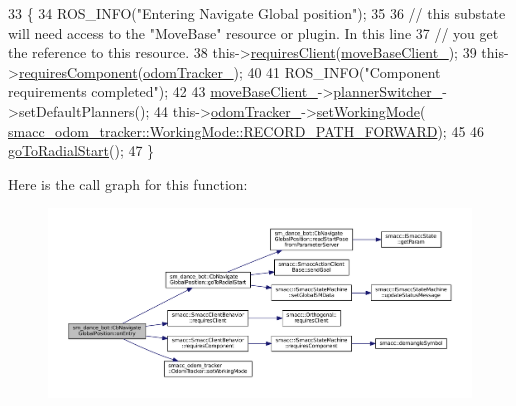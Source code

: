 \begin{DoxyCode}
33   \{
34     ROS\_INFO(\textcolor{stringliteral}{"Entering Navigate Global position"});
35 
36     \textcolor{comment}{// this substate will need access to the "MoveBase" resource or plugin. In this line}
37     \textcolor{comment}{// you get the reference to this resource.}
38     this->\hyperlink{classsmacc_1_1SmaccClientBehavior_adc21bbd45d36bd81ca6f778ed161807a}{requiresClient}(\hyperlink{classsm__dance__bot_1_1CbNavigateGlobalPosition_acaea61e5bdf69018d945f6c7025acfc0}{moveBaseClient\_});
39     this->\hyperlink{classsmacc_1_1SmaccClientBehavior_a011246bb1424f8bf8c9322f652db9d88}{requiresComponent}(\hyperlink{classsm__dance__bot_1_1CbNavigateGlobalPosition_a1d9fbebe8579cdef9485698e99ca8a41}{odomTracker\_});
40 
41     ROS\_INFO(\textcolor{stringliteral}{"Component requirements completed"});
42 
43     \hyperlink{classsm__dance__bot_1_1CbNavigateGlobalPosition_acaea61e5bdf69018d945f6c7025acfc0}{moveBaseClient\_}->\hyperlink{classsmacc_1_1SmaccMoveBaseActionClient_ae24164268108abf0b35cf51bfba5ec67}{plannerSwitcher\_}->setDefaultPlanners();
44     this->\hyperlink{classsm__dance__bot_1_1CbNavigateGlobalPosition_a1d9fbebe8579cdef9485698e99ca8a41}{odomTracker\_}->\hyperlink{classsmacc__odom__tracker_1_1OdomTracker_a38fbca999297c46dc95628cc60851a45}{setWorkingMode}(
      \hyperlink{namespacesmacc__odom__tracker_ade9730dd5cc10ccfad9362176cf46c33a989d06a586bcf9520889228da7faa643}{smacc\_odom\_tracker::WorkingMode::RECORD\_PATH\_FORWARD});
45 
46     \hyperlink{classsm__dance__bot_1_1CbNavigateGlobalPosition_a0832f7a7f205cc483be012aef9501312}{goToRadialStart}();
47   \}
\end{DoxyCode}


Here is the call graph for this function\+:
\nopagebreak
\begin{figure}[H]
\begin{center}
\leavevmode
\includegraphics[width=350pt]{classsm__dance__bot_1_1CbNavigateGlobalPosition_a281fe5c962ca5004f44e929159991c6a_cgraph}
\end{center}
\end{figure}


